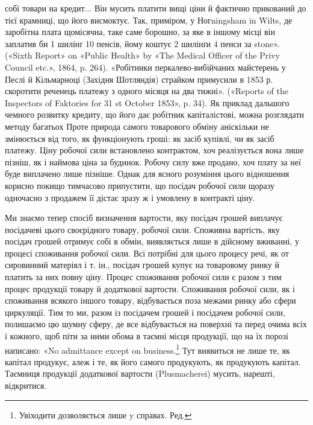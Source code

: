 {собі товари на кредит... Він мусить платити вищі ціни й фактично
прикований до тієї крамниці, що його висмоктує. Так, приміром, у Ногningsham
in Wilts, де заробітна плата щомісячна, таке саме борошно, за
яке в іншому місці він заплатив би 1 шилінґ 10 пенсів, йому коштує 2 шилінґи
4 пенси за stone». («Sixth Report» on «Public Health» by «The
Medical Officer of the Privy Council etc.», 1864, p. 264). «Робітники перкалево-вибійчаних
майстерень у Песлі й Кільмарноці (Західня Шотляндія)
страйком примусили в 1853 р. скоротити реченець платежу з одного
місяця на два тижні». («Reports of the Inspectors of Faktories for 31 st
October 1853», p. 34). Як приклад дальшого чемного розвитку кредиту,
що його дає робітник капіталістові, можна розглядати методу багатьох
} Проте природа самого товарового
обміну аніскільки не змінюється від того, як функціонують
гроші: як засіб купівлі, чи як засіб платежу. Ціну робочої сили
встановлено контрактом, хоч реалізується вона лише пізніш,
як і наймова ціна за будинок. Робочу силу вже продано, хоч
плату за неї буде виплачено лише пізніше. Однак для ясного розуміння
цього відношення корисно покищо тимчасово припустити,
що посідач робочої сили щоразу одночасно з продажем її дістає
зразу ж і умовлену в контракті ціну.

Ми знаємо тепер спосіб визначення вартости, яку посідач
грошей виплачує посідачеві цього своєрідного товару, робочої
сили. Споживна вартість, яку посідач грошей отримує собі в
обмін, виявляється лише в дійсному вживанні, у процесі споживання
робочої сили. Всі потрібні для цього процесу речі, як от
сировинний матеріял і т. ін., посідач грошей купує на товаровому
ринку й платить за них повну ціну. Процес споживання
робочої сили є разом з тим процес продукції товару й додаткової
вартости. Споживання робочої сили, як і споживання всякого
іншого товару, відбувається поза межами ринку або сфери циркуляції.
Тим то ми, разом із посідачем грошей і посідачем робочої
сили, полишаємо цю шумну сферу, де все відбувається на поверхні
та перед очима всіх і кожного, щоб піти за ними обома в таємні
місця продукції, що на їх порозі написано: «No admittance except
on business.\footnote*{
Увіходити дозволяється лише y справах. Ред.
} Тут виявиться не лише те, як капітал продукує,
алеж і те, як його самого продукують, як продукують капітал.
Таємниця продукції додаткової вартости (Plusmacherei) мусить,
нарешті, відкритися.


